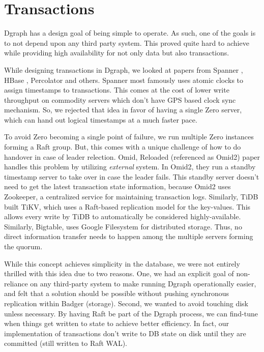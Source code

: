\documentclass[letterpaper,twocolumn,10pt]{article}
\begin{document}
\section{Transactions} \label{txn}

Dgraph has a design goal of being simple to operate. As such, one of the goals
is to not depend upon any third party system. This proved quite hard to achieve
while providing high availability for not only data but also transactions.

While designing transactions in Dgraph, we looked at papers from Spanner
\cite{spanner}, HBase \cite{omid2}, Percolator \cite{peng} and others. Spanner
most famously uses atomic clocks to assign timestamps to transactions. This
comes at the cost of lower write throughput on commodity servers which don't
have GPS based clock sync mechanism. So, we rejected that idea in favor of
having a single Zero server, which can hand out logical timestamps at a much
faster pace.

To avoid Zero becoming a single point of failure, we run multiple Zero instances
forming a Raft group. But, this comes with a unique challenge of how to do
handover in case of leader relection.  Omid, Reloaded\cite{omid2} (referenced as
Omid2) paper handles this problem by utilizing \textit{external} system. In
Omid2, they run a standby timestamp server to take over in case the leader
fails. This standby server doesn't need to get the latest transaction state
information, because Omid2 uses Zookeeper\cite{zoo}, a centralized service for
maintaining transaction logs. Similarly, TiDB built TiKV, which uses a
Raft-based replication model for the key-values. This allows every write by TiDB
to automatically be considered highly-available.  Similarly,
Bigtable\cite{bigtable}, uses Google Filesystem\cite{gfs} for distributed
storage.  Thus, no direct information transfer needs to happen among the
multiple servers forming the quorum.

While this concept achieves simplicity in the database, we were not entirely
thrilled with this idea due to two reasons. One, we had an explicit goal of
non-reliance on any third-party system to make running Dgraph operationally
easier, and felt that a solution should be possible without pushing synchronous
replication within Badger (storage). Second, we wanted to avoid touching disk
unless necessary. By having Raft be part of the Dgraph process, we can find-tune
when things get written to state to achieve better efficiency. In fact, our
implementation of transactions don't write to DB state on disk until they are
committed (still written to Raft WAL).
\end{document}
